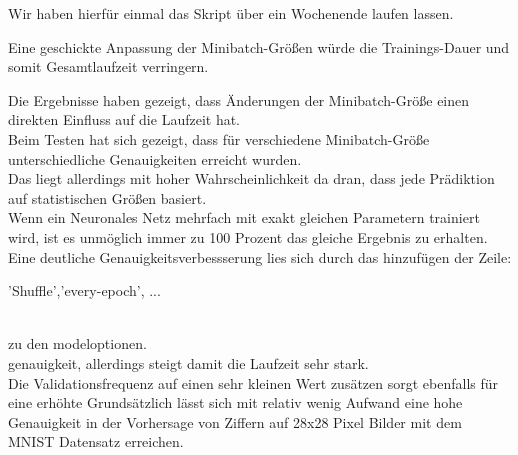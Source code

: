 \documentclass[8pt,a4paper]{article}
\begin{document}
Wir haben hierfür einmal das Skript über ein Wochenende laufen lassen.

Eine geschickte Anpassung der Minibatch-Größen würde die Trainings-Dauer und somit Gesamtlaufzeit verringern.

Die Ergebnisse haben gezeigt, dass Änderungen der Minibatch-Größe einen direkten Einfluss auf die Laufzeit hat.\\
Beim Testen hat sich gezeigt, dass für verschiedene Minibatch-Größe unterschiedliche Genauigkeiten erreicht wurden.\\
Das liegt allerdings mit hoher Wahrscheinlichkeit da dran, dass jede Prädiktion auf statistischen Größen basiert.\\
Wenn ein Neuronales Netz mehrfach mit exakt gleichen Parametern trainiert wird, ist es  unmöglich immer zu 100 Prozent das gleiche Ergebnis zu erhalten.
\\

Eine deutliche Genauigkeitsverbessserung lies sich durch das hinzufügen der Zeile:\\

\begin{listing}
'Shuffle','every-epoch', ...
\end{listing}
\\
zu den modeloptionen.
\\genauigkeit, allerdings steigt damit die Laufzeit sehr stark.\\
Die Validationsfrequenz auf einen sehr kleinen Wert zusätzen sorgt ebenfalls für eine erhöhte 
Grundsätzlich lässt sich mit relativ wenig Aufwand eine hohe Genauigkeit in der Vorhersage von Ziffern auf 28x28 Pixel Bilder mit dem MNIST Datensatz erreichen.\\
\end{document}
